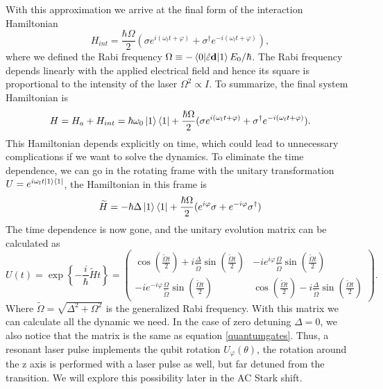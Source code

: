 With this approximation we arrive at the final form of the interaction Hamiltonian
\begin{equation}
H_{int} = \frac{\hbar \Omega}{2}(\sigma e^{i(\omega_l t+\varphi)} + \sigma^\dagger e^{-i(\omega_l t+\varphi)}),
\end{equation}
 where we defined the Rabi frequency $\Omega \equiv - \braket{0|\hat{\varepsilon} \mathbf{d}|1}E_0/\hbar$. The Rabi frequency depends linearly with the applied electrical field and hence its square is proportional to the intensity of the laser $\Omega ^2 \propto I$. To summarize, the final system Hamiltonian is
 \begin{equation}
 \label{2levelatomhamiltonian}
H = H_a + H_{int} = \hbar\omega_0 \ket{1}\bra{1} + \frac{\hbar \Omega}{2}(\sigma e^{i(\omega_l t+\varphi)} + \sigma^\dagger e^{-i(\omega_l t+\varphi)}).
 \end{equation}
This Hamiltonian depends explicitly on time, which could lead to unnecessary complications if we want to solve the dynamics. To eliminate the time dependence, we can go in the rotating frame with the unitary transformation $U = e^{i\omega_l t \ket{1}\bra{1}}$, the Hamiltonian in this frame is
\begin{equation}
\label{Hamiltonianrotatingframe}
\widetilde{H} = -\hbar \Delta \ket{1}\bra{1} + \frac{\hbar \Omega}{2}(e^{i\varphi}\sigma + e^{-i\varphi}\sigma^\dagger)
\end{equation}
The time dependence is now gone, and the unitary evolution matrix can be calculated as
\begin{equation}
\label{laserpulse}
U(t) = \exp\left\{-\frac{i}{\hbar} \widetilde{H} t \right\} =
 \begin{pmatrix}
  \cos\left(\frac{\widetilde{\Omega} t}{2}\right) + i \frac{\Delta}{\widetilde{\Omega}} \sin\left(\frac{\widetilde{\Omega} t}{2}\right) & -ie^{i\varphi}\frac{\Omega}{\widetilde{\Omega}}  \sin\left(\frac{\widetilde{\Omega} t}{2}\right) \\
  -ie^{-i\varphi}\frac{\Omega}{\widetilde{\Omega}}  \sin\left(\frac{\widetilde{\Omega} t}{2}\right)  & \cos\left(\frac{\widetilde{\Omega} t}{2}\right) - i \frac{\Delta}{\widetilde{\Omega}} \sin\left(\frac{\widetilde{\Omega} t}{2}\right)
\end{pmatrix}.
\end{equation}
Where $\widetilde{\Omega} = \sqrt{\Delta^2 + \Omega^2}$ is the generalized Rabi frequency. With this matrix we can calculate all the dynamic we need. In the case of zero detuning $\Delta = 0$, we also notice that the matrix is the same as equation \eqref{quantumgates}. Thus, a resonant laser pulse implements the qubit rotation $U_{\varphi}(\theta)$, the rotation around the z axis is performed with a laser pulse as well, but far detuned from the transition. We will explore this possibility later in the AC Stark shift.\\

